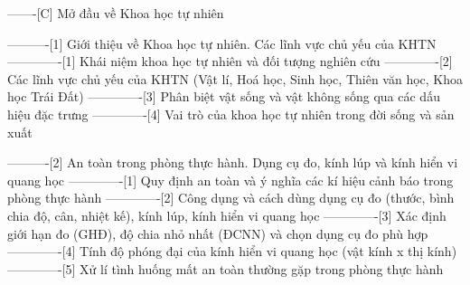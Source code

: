-------[C] Mở đầu về Khoa học tự nhiên

----------[1] Giới thiệu về Khoa học tự nhiên. Các lĩnh vực chủ yếu của KHTN
-------------[1] Khái niệm khoa học tự nhiên và đối tượng nghiên cứu
-------------[2] Các lĩnh vực chủ yếu của KHTN (Vật lí, Hoá học, Sinh học, Thiên văn học, Khoa học Trái Đất)
-------------[3] Phân biệt vật sống và vật không sống qua các dấu hiệu đặc trưng
-------------[4] Vai trò của khoa học tự nhiên trong đời sống và sản xuất

----------[2] An toàn trong phòng thực hành. Dụng cụ đo, kính lúp và kính hiển vi quang học
-------------[1] Quy định an toàn và ý nghĩa các kí hiệu cảnh báo trong phòng thực hành
-------------[2] Công dụng và cách dùng dụng cụ đo (thước, bình chia độ, cân, nhiệt kế), kính lúp, kính hiển vi quang học
-------------[3] Xác định giới hạn đo (GHĐ), độ chia nhỏ nhất (ĐCNN) và chọn dụng cụ đo phù hợp
-------------[4] Tính độ phóng đại của kính hiển vi quang học (vật kính x thị kính)
-------------[5] Xử lí tình huống mất an toàn thường gặp trong phòng thực hành
